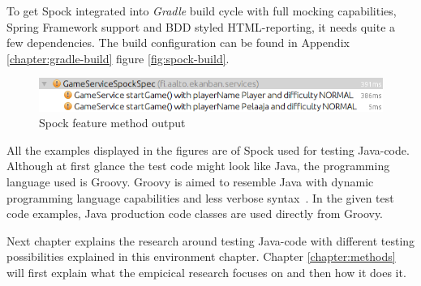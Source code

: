     To get Spock integrated into \textit{Gradle} build cycle with full mocking capabilities, Spring Framework support and BDD styled HTML-reporting, it needs
    quite a few dependencies. The build configuration can be found in Appendix \ref{chapter:gradle-build} figure \ref{fig:spock-build}.

    \clearpage
    \begin{figure}[H]
      \begin{center}
        \begin{topbot}[style=mdstyle]
        \includegraphics[width=\textwidth]{images/spock-result.png}
        \end{topbot}
        \caption{Spock feature method output}
        \label{fig:spock-result}
      \end{center}
    \end{figure}
    All the examples displayed in the figures are of Spock used for testing Java-code. Although at first glance the test code might
    look like Java, the programming language used is Groovy. Groovy is aimed to resemble Java with dynamic programming language
    capabilities and less verbose syntax~\cite{kapelonis2016java}. In the given test code examples, Java production code classes are used directly
    from Groovy.

    Next chapter explains the research around testing Java-code with different testing possibilities explained in this environment
    chapter. Chapter \ref{chapter:methods} will first explain what the empicical research focuses on and then how it does it.

